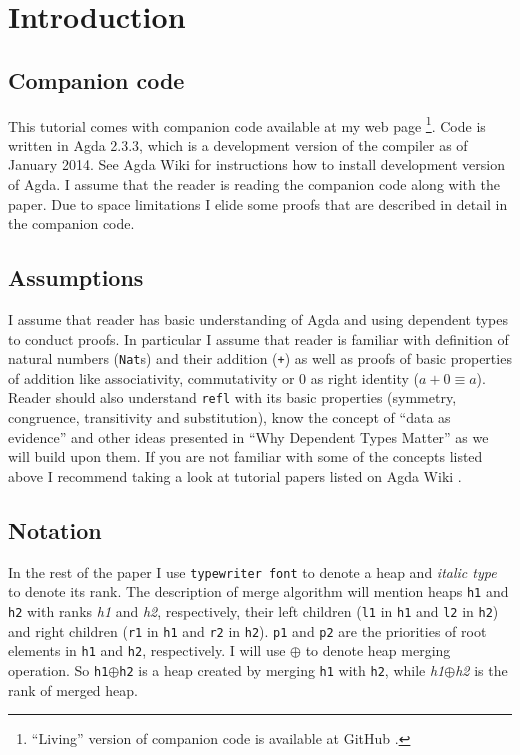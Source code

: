 \section{Introduction}

\subsection{Companion code}

This tutorial comes with companion code available at my web page \cite{js-webhome}\footnote{``Living'' version of companion code is available at GitHub \cite{js-github}.}. Code is written in Agda 2.3.3, which is a development version of the compiler as of January 2014. See Agda Wiki \cite{agda-wiki} for instructions how to install development version of Agda. I assume that the reader is reading the companion code along with the paper. Due to space limitations I elide some proofs that are described in detail in the companion code.

\subsection{Assumptions}

I assume that reader has basic understanding of Agda and using dependent types to conduct proofs. In particular I assume that reader is familiar with definition of natural numbers (\texttt{Nat}s) and their addition (\texttt{+}) as well as proofs of basic properties of addition like associativity, commutativity or 0 as right identity ($a + 0 ≡ a$). Reader should also understand \texttt{refl} with its basic properties (symmetry, congruence, transitivity and substitution), know the concept of ``data as evidence'' and other ideas presented in ``Why Dependent Types Matter'' \cite{AltMcBMcK05} as we will build upon them. If you are not familiar with some of the concepts listed above I recommend taking a look at tutorial papers listed on Agda Wiki \cite{agda-wiki}.

\subsection{Notation}

In the rest of the paper I use \texttt{typewriter font} to denote a heap and \textit{italic type} to denote its rank. The description of merge algorithm will mention heaps \texttt{h1} and \texttt{h2} with ranks \textit{h1} and \textit{h2}, respectively, their left children (\texttt{l1} in \texttt{h1} and \texttt{l2} in \texttt{h2}) and right children (\texttt{r1} in \texttt{h1} and \texttt{r2} in \texttt{h2}). \texttt{p1} and \texttt{p2} are the priorities of root elements in \texttt{h1} and \texttt{h2}, respectively. I will use $\oplus$ to denote heap merging operation. So \texttt{h1}$\oplus$\texttt{h2} is a heap created by merging \texttt{h1} with \texttt{h2}, while \textit{h1}$\oplus$\textit{h2} is the rank of merged heap.

